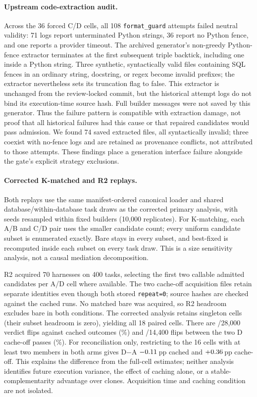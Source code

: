 \paragraph{Upstream code-extraction audit.}\label{app:extraction}
Across the 36 forced C/D cells, all 108 \texttt{format\_guard} attempts
failed neutral validity: 71 logs report unterminated Python strings,
36 report no Python fence, and one reports a provider timeout.
The archived generator's non-greedy Python-fence extractor terminates at
the first subsequent triple backtick, including one inside a Python
string. Three synthetic, syntactically valid files containing SQL fences
in an ordinary string, docstring, or regex become invalid prefixes;
the extractor nevertheless sets its truncation flag to false.
This extractor is unchanged from the review-locked commit, but the historical attempt
logs do not bind its execution-time source hash. Full builder messages
were not saved by this generator. Thus the failure pattern is compatible
with extraction damage, not proof that all historical failures had this
cause or that repaired candidates would pass admission.
We found 74 saved extracted files, all syntactically invalid; three
coexist with no-fence logs and are retained as provenance conflicts,
not attributed to those attempts. These findings place a generation
interface failure alongside the gate's explicit strategy exclusions.

\paragraph{Corrected K-matched and R2 replays.}\label{app:r2}
Both replays use the same manifest-ordered canonical loader and shared
database/within-database task draws as the corrected primary analysis,
with seeds resampled within fixed builders (10{,}000 replicates).
For K-matching, each A/B and C/D pair uses the smaller candidate count;
every uniform candidate subset is enumerated exactly. Bare stays in every
subset, and best-fixed is recomputed inside each subset on every task draw.
This is a size sensitivity analysis, not a causal mediation decomposition.

R2 acquired 70 harnesses on 400 tasks, selecting the first two callable
admitted candidates per A/D cell where available. The two cache-off
acquisition files retain separate identities even though both stored
\texttt{repeat=0}; source hashes are checked against the cached runs.
No matched bare was acquired, so R2 headroom excludes bare in both
conditions. The corrected analysis retains singleton cells (their subset
headroom is zero), yielding all 18 paired cells.
There are \RevisionRtwoFlips/28{,}000 verdict flips against cached outcomes
(\RevisionRtwoFlipPercent\%) and
\RevisionRtwoRepeatFlips/14{,}400 flips between the two D cache-off passes
(\RevisionRtwoRepeatPercent\%).
For reconciliation only, restricting to the 16 cells with at least two
members in both arms gives D$-$A $-0.11$\,pp cached
and $+0.36$\,pp cache-off. This explains the difference
from the full-cell estimates; neither analysis identifies future execution
variance, the effect of caching alone, or a stable-complementarity advantage
over clones. Acquisition time and caching condition are not isolated.

